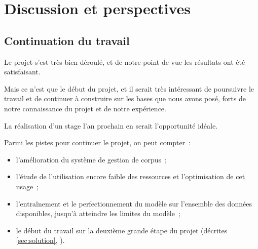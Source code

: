 \section{Discussion et perspectives}
\subsection{Continuation du travail}
Le projet s'est très bien déroulé, et de notre point de vue les résultats ont été satisfaisant.

Mais ce n'est que le début du projet, et il serait très intéressant de poursuivre le travail et de continuer à construire sur les bases que nous avons posé, forts de notre connaissance du projet et de notre expérience.

La réalisation d'un stage l'an prochain en serait l'opportunité idéale.

Parmi les pistes pour continuer le projet, on peut compter~:
\begin{itemize}
	\item l'amélioration du système de gestion de corpus~;
	\item l'étude de l'utilisation encore faible des ressources et l'optimisation de cet usage~;
	\item l'entraînement et le perfectionnement du modèle sur l'ensemble des données disponibles, jusqu'à atteindre les limites du modèle~;
	\item le début du travail sur la deuxième grande étape du projet (décrites \autoref{sec:solution}, ).
\end{itemize}
